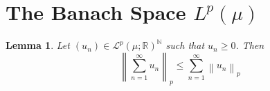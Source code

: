 \documentclass[11pt, a4paper, openany]{book}
\newtheorem{thm}{Theorem}\newtheorem{lem}{Lemma}\newtheorem{crl}{Corollary}
\theoremstyle{definition}
\begin{document}
\section{The Banach Space \texorpdfstring{$L^p(\mu)$}{Lp}}
    \begin{lem}\label{p-norm triangle inequality for series}
        Let $(u_n)\in\mathcal{L}^p(\mu;\mathbb{R})^\mathbb{N}$ such that $u_n\geqslant 0$. Then
        \[\left\|\sum_{n=1}^\infty u_n\right\|_p\leqslant \sum_{n=1}^\infty\left\|u_n\right\|_p\]
    \end{lem}
\end{document}
